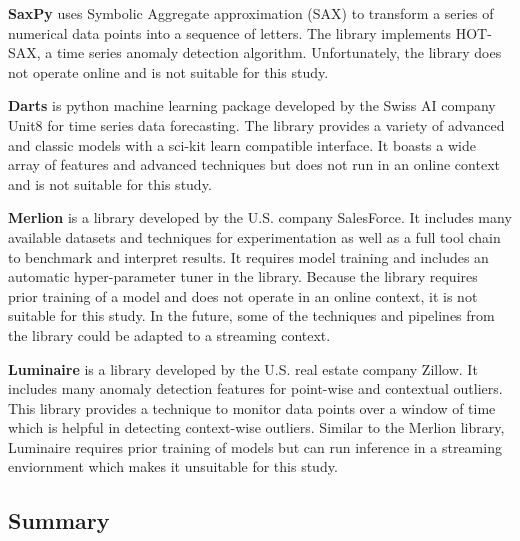 \textbf{SaxPy} \parencite{senin2018grammarviz-saxpy} uses Symbolic Aggregate approximation (SAX) to transform a series of numerical data points into a sequence of letters. The library implements HOT-SAX, a time series anomaly detection algorithm. Unfortunately, the library does not operate online and is not suitable for this study.


\textbf{Darts} \parencite{herzen2021darts} is python machine learning package developed by the Swiss AI company Unit8 for time series data forecasting. The library provides a variety of advanced and classic models with a sci-kit learn compatible interface. It boasts a wide array of features and advanced techniques but does not run in an online context and is not suitable for this study.

\textbf{Merlion} \parencite{bhatnagar2021merlion} is a library developed by the U.S. company SalesForce. It includes many available datasets and techniques for experimentation as well as a full tool chain to benchmark and interpret results. It requires model training and includes an automatic hyper-parameter tuner in the library. Because the library requires prior training of a model and does not operate in an online context, it is not suitable for this study. In the future, some of the techniques and pipelines from the library could be adapted to a streaming context. 

\textbf{Luminaire} \parencite{chakraborty2020building-luminaire} is a library developed by the U.S. real estate company Zillow. It includes many anomaly detection features for point-wise and contextual outliers. This library provides a technique to monitor data points over a window of time which is helpful in detecting context-wise outliers. Similar to the Merlion library, Luminaire requires prior training of models but can run inference in a streaming enviornment which makes it unsuitable for this study.

\subsection{Summary}






